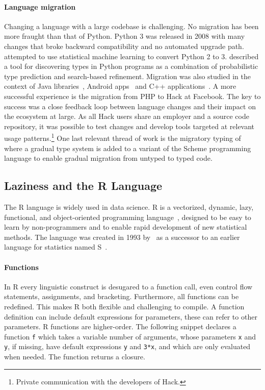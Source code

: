 \documentclass[review,creen,acmsmall]{acmart}
\renewcommand{\c}[1]{\lstinline |#1|\xspace}
\begin{document}
\paragraph{Language migration} Changing a language with a large codebase
is challenging. No migration has been more fraught than that of Python. Python 3
was released in 2008 with many changes that broke backward compatibility and no
automated upgrade path. \citet{Agg15} attempted to use statistical machine
learning to convert Python 2 to 3. \citet{Pra20} described a tool for
discovering types in Python programs as a combination of probabilistic type
prediction and search-based refinement. Migration was also studied in the
context of Java libraries~\cite{Xu19}, Android apps~\cite{Orso20} and C++
applications~\cite{OB20}. A more successful experience is the migration from PHP
to Hack at Facebook. The key to success was a close feedback loop between
language changes and their impact on the ecosystem at large. As all Hack users
share an employer and a source code repository, it was possible to test changes
and develop tools targeted at relevant usage patterns.\footnote{Private
  communication with the developers of Hack.} One last relevant thread of work
is the migratory typing of \citet{matthias06} where a gradual type system is
added to a variant of the Scheme programming language to enable gradual
migration from untyped to typed code.

\subsection{Laziness and the R Language}

The R language is widely used in data science. R is a vectorized, dynamic, lazy,
functional, and object-oriented programming language~\cite{ecoop12}, designed to
be easy to learn by non-programmers and to enable rapid development of new
statistical methods. The language was created in 1993 by~\citet{R96} as a
successor to an earlier language for statistics named S~\cite{S88}.

\paragraph{Functions}
In R every linguistic construct is desugared to a function call, even control
flow statements, assignments, and bracketing. Furthermore, all functions can be
redefined. This makes R both flexible and challenging to compile. A function
definition can include default expressions for parameters, these can refer to
other parameters. R functions are higher-order. The following snippet declares a
function \c f which takes a variable number of arguments, whose parameters
\c x and \c y, if missing, have default expressions \c y and
\c{3*x}, and which are only evaluated when needed. The function returns a
closure.
\end{document}
